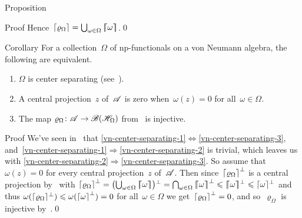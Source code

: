 \documentclass[a]{subfiles}
\begin{document}
\begin{parsec}
\begin{point}{Proposition}
\begin{point}{Proof}
Hence~$\left\lceil\varrho_\Omega\right\rceil=\bigcup_{\omega\in\Omega}\left\lceil\!\!\left\lceil\omega\right\rceil\!\!\right\rceil$.\qed
\end{point}
\end{point}
\begin{point}{Corollary}%
For a collection~$\Omega$ of np-functionals
on a von Neumann algebra,
the following are equivalent.
\begin{enumerate}
\item
\label{vn-center-separating-1}
$\Omega$ is center separating (see~).
\item
\label{vn-center-separating-2}
A central projection~$z$ of~$\mathscr{A}$ is zero
when~$\omega(z)=0$ for all~$\omega\in\Omega$.
\item
\label{vn-center-separating-3}
The map $\varrho_\Omega\colon\mathscr{A}\to\mathscr{B}(\mathscr{H}_\Omega)$
from~ 
is injective.
\end{enumerate}
\begin{point}{Proof}%
We've seen in~
that
\ref{vn-center-separating-1}$\iff$\ref{vn-center-separating-3},
and~\ref{vn-center-separating-1}$\Rightarrow$\ref{vn-center-separating-2}
is trivial,
which leaves us with 
\ref{vn-center-separating-2}$\Rightarrow$\ref{vn-center-separating-3}.
So assume that~$\omega(z)=0$ for every central projection~$z$
of~$\mathscr{A}$.
Then since~$\left\lceil\varrho_\Omega\right\rceil^\perp$
is a central projection
by~
with
$\ceil{\varrho_\Omega}^\perp
=\smash{\bigl(\bigcup_{\omega\in\Omega} \smash{\cceil{\omega}\bigr)}}^\perp
=\bigcap_{\omega\in \Omega} \cceil{\omega}^\perp
\leq \smash{\cceil{\omega}}^\perp
\leq \smash{\ceil{\omega}}^\perp$
and thus
$\omega(\smash{\left\lceil\varrho_\Omega\right\rceil}^\perp)
\leqslant \omega(\left\lceil\omega\right\rceil^\perp)=0$
for all~$\omega\in\Omega$
we get~$\left\lceil\varrho_\Omega\right\rceil^\perp =0$,
and so~$\varrho_\Omega$ is injective
by~.\qed
\end{point}
\end{point}
\end{parsec}
\end{document}
